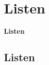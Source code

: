 \documentclass["WS\space 16-17\space -\space LaTeX-Kurs\space -\space Praesentation\space -\space 2.tex"]{subfiles}
\begin{document}
\section{Listen}
\begin{frame}[c]
	\begin{center}
		\LARGE \textbf{Listen}
	\end{center}
\end{frame}
\subsection*{Listen}
\end{document}
